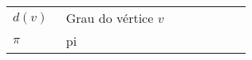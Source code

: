 

\begin{listasimb}

\begin{longtable}[l]{p{0.2\linewidth}p{0.7\linewidth}}
	$d(v)$ & Grau do vértice $v$\\
	$\pi$ & pi \\
\end{longtable}

\end{listasimb}

